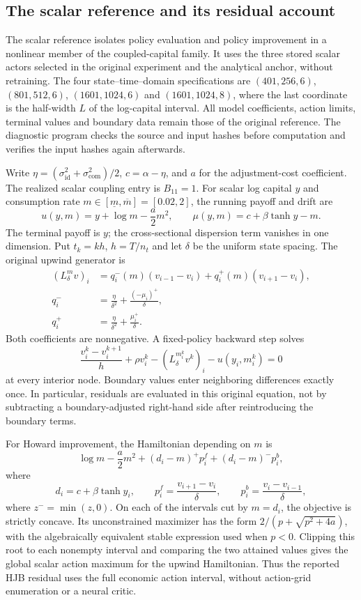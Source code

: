 \subsection{The scalar reference and its residual account}
\label{sec:r14-scalar-account}

The scalar reference isolates policy evaluation and policy improvement in a
nonlinear member of the coupled-capital family. It uses the three stored scalar
actors selected in the original experiment and the analytical anchor, without
retraining. The four state--time--domain specifications are
$(401,256,6)$, $(801,512,6)$, $(1601,1024,6)$ and $(1601,1024,8)$, where the
last coordinate is the half-width $L$ of the log-capital interval. All model
coefficients, action limits, terminal values and boundary data remain those
of the original reference. The diagnostic program checks the source and input
hashes before computation and verifies the input hashes again afterwards.

Write $\eta=(\sigma_{\mathrm{id}}^2+\sigma_{\mathrm{com}}^2)/2$,
$c=\alpha-\eta$, and $a$ for the adjustment-cost coefficient. The realized
scalar coupling entry is $B_{11}=1$. For scalar log capital $y$ and consumption
rate $m\in[\underline m,\overline m]=[0.02,2]$, the running payoff and drift are
\[
 u(y,m)=y+\log m-\frac a2m^2,
 \qquad \mu(y,m)=c+\beta\tanh y-m.
\]
The terminal payoff is $y$; the cross-sectional dispersion term vanishes in
one dimension. Put $t_k=kh$, $h=T/n_t$ and let $\delta$ be the uniform state
spacing. The original upwind generator is
\begin{align*}
 (L^m_\delta v)_i
 &=q_i^-(m)(v_{i-1}-v_i)+q_i^+(m)(v_{i+1}-v_i),\\
 q_i^-&=\frac{\eta}{\delta^2}+\frac{(-\mu_i)^+}{\delta},\\
 q_i^+&=\frac{\eta}{\delta^2}+\frac{\mu_i^+}{\delta}.
\end{align*}
Both coefficients are nonnegative. A fixed-policy backward step solves
\[
 \frac{v_i^k-v_i^{k+1}}{h}+\rho v_i^k
 -(L^{m_i^k}_\delta v^k)_i-u(y_i,m_i^k)=0
\]
at every interior node. Boundary values enter neighboring differences exactly
once. In particular, residuals are evaluated in this original equation,
not by subtracting a boundary-adjusted right-hand side after reintroducing
the boundary terms.

For Howard improvement, the Hamiltonian depending on $m$ is
\[
 \log m-\frac a2m^2+(d_i-m)^+p_i^f+(d_i-m)^-p_i^b,
\]
where
\[
 d_i=c+\beta\tanh y_i,\qquad
 p_i^f=\frac{v_{i+1}-v_i}{\delta},\qquad
 p_i^b=\frac{v_i-v_{i-1}}{\delta},
\]
where $z^-=\min(z,0)$. On each of the intervals cut by $m=d_i$, the
objective is strictly concave. Its unconstrained maximizer has the form
$2/(p+\sqrt{p^2+4a})$, with the algebraically equivalent stable expression
used when $p<0$. Clipping this root to each nonempty interval and comparing
the two attained values gives the global scalar action maximum for the
upwind Hamiltonian. Thus the reported HJB residual uses the full economic
action interval, without action-grid enumeration or a neural critic.

